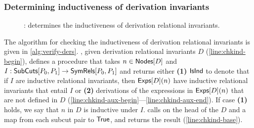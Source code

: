 \subsubsection{Determining inductiveness of derivation invariants}
\label{sec:chk-ind}
\begin{figure}
  \centering
  \begin{algorithm}[H]
    {  %
      { %
         {
          \Return{$\true$} } %
      \label{line:chkind-aux-end} } %
    \label{line:chkind-base} } %
    \caption{%
      \chkinductive: determines the inductiveness of derivation
      relational invariants. }
    \label{alg:verify-ders}
  \end{algorithm}
\end{figure}
%
The algorithm \chkinductive for checking the inductiveness of
derivation relational invariants is given in
\autoref{alg:verify-ders}.
%
\chkinductive, given derivation relational invariants $D$
(\autoref{line:chkind-begin}), defines a procedure \chkindaux that
takes $n \in \mathsf{Nodes}[ D ]$ and $I: \mathsf{SubCuts}[ P_0, P_1 ] \to
\mathsf{SymRels}[ P_0, P_1 ]$ and returns either %
\textbf{(1)} $\mathsf{IsInd}$ to denote that if $I$ are inductive relational
invariants, then $\mathsf{Exps}[ D ](n)$ have inductive relational
invariants that entail $I$ or
%
\textbf{(2)} derivations of the expressions in $\mathsf{Exps}[ D ](n)$ that
are not defined in $D$
(\autoref{line:chkind-aux-begin}---\autoref{line:chkind-aux-end}).
%
If case \textbf{(1)} holds, we say that $n$ in $D$ is inductive under
$I$.
%
\chkinductive calls \chkindaux on the head of the $D$ and a map from
each subcut pair to $\true$, and returns the result
(\autoref{line:chkind-base}).

